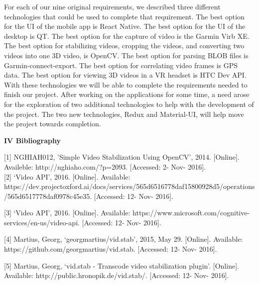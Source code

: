 \documentclass[10pt,draftclsnofoot,onecolumn]{IEEEtran}
\begin{document}
 For each of our nine original requirements, we described three different technologies that could be used to complete that requirement. The best option for the UI of the mobile app is React Native. The best option for the UI of the desktop is QT. The best option for the capture of video is the Garmin Virb XE. The best option for stabilizing videos, cropping the videos, and converting two videos into one 3D video, is OpenCV. The best option for parsing BLOB files is Garmin-connect-export. The best option for correlating video frames is GPS data. The best option for viewing 3D videos in a VR headset is HTC Dev API. With these technologies we will be able to complete the requirements needed to finish our project. After working on the applications for some time, a need arose for the exploration of two additional technologies to help with the development of the project. The two new technologies, Redux and Material-UI, will help move the project towards completion.\\
 \vspace{5mm}

{\Medium\textbf{IV Bibliography}}\\
\vspace{5mm}

[1] NGHIAH012, 'Simple Video Stabilization Using OpenCV', 2014. [Online]. Availeble: http://nghiaho.com/?p=2093. [Accessed: 2- Nov- 2016].\\

 \vspace{2mm}
[2] ‘Video API’, 2016.  [Online]. Available: https://dev.projectoxford.ai/docs/services/565d6516778daf15800928d5/operations/565d6517778daf0978c45e35. [Accessed: 12- Nov- 2016]. \\
 \vspace{2mm}


[3] ‘Video API’, 2016.  [Online]. Available: https://www.microsoft.com/cognitive-services/en-us/video-api. [Accessed: 12- Nov- 2016]. \\
 \vspace{2mm}


[4] Martius, Georg, ‘georgmartius/vid.stab’, 2015, May 29. [Online]. Available: https://github.com/georgmartius/vid.stab. [Accessed: 12- Nov- 2016].\\
 \vspace{2mm}


[5] Martius, Georg, ‘vid.stab - Transcode video stabilization plugin’. [Online]. Available: http://public.hronopik.de/vid.stab/.  [Accessed: 12- Nov- 2016]. \\
\end{document}
